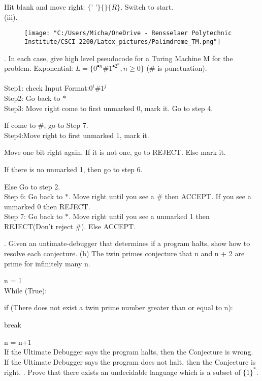 \documentclass{article}
\begin{document}
Hit blank and move right: $\{\text{' '}\}\{\}\{R\}$. Switch to start.\\
(iii).
\begin{center}
	\begin{figure}[h]
		\texttt{[image: "C:/Users/Micha/OneDrive - Rensselaer Polytechnic Institute/CSCI 2200/Latex\_pictures/Palimdrome\_TM.png"]}\\
	\end{figure}
\end{center}


\clearpage
\noindent {}. In each case, give high level pseudocode for a Turing Machine M for the problem. Exponential: $L = \{0^{•n}\#1^{•2^n}, n \geq 0\}$ (\# is punctuation).\\\\
Step1: check Input Format:$0^i \# 1^j$\\
Step2: Go back to $*$\\
Step3: Move right come to first unmarked 0, mark it. Go to step 4.

If come to \#, go to Step 7.\\
Step4:Move right to first unmarked 1, mark it.

Move one bit right again. If it is not one, go to REJECT. Else mark it.

If there is no unmarked 1, then go to step 6.

Else Go to step 2.\\
Step 6: Go back to $*$. Move right until you see a \# then ACCEPT. If you see a unmarked 0 then REJECT.\\
Step 7: Go back to $*$. Move right until you see a unmarked 1 then REJECT(Don't reject \#). Else ACCEPT. 


\clearpage

\noindent {}. Given an untimate-debugger that determines if a program halts, show how to resolve each conjecture.
(b) The twin primes conjecture that n and n + 2 are prime for infinitely many n.

n = 1\\
While (True):

	if (There does not exist a twin prime number greater than or equal to n):
	
		\qquad break
		
	n = n+1\\
If the Ultimate Debugger says the program halts, then the Conjecture is wrong. If the Ultimate Debugger says the program does not halt, then the Conjecture is right.
\clearpage
{}. Prove that there exists an undecidable language which is a subset of $\{1\}^*$.\\
\end{document}
